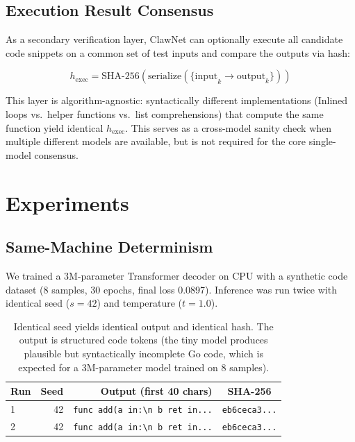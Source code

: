 \documentclass[11pt,a4paper]{article}
\begin{document}
\subsection{Execution Result Consensus}

As a secondary verification layer, ClawNet can optionally execute all
candidate code snippets on a common set of test inputs and compare the
outputs via hash:

\begin{equation}
h_{\text{exec}} = \text{SHA-256}(\text{serialize}(\text{\{input}_k \to \text{output}_k\}))
\end{equation}

This layer is algorithm-agnostic: syntactically different implementations
(Inlined loops vs.\ helper functions vs.\ list comprehensions) that compute
the same function yield identical $h_{\text{exec}}$. This serves as a
cross-model sanity check when multiple different models are available,
but is not required for the core single-model consensus.

\section{Experiments}
\label{sec:experiments}

\subsection{Same-Machine Determinism}

We trained a 3M-parameter Transformer decoder on CPU with a synthetic
code dataset (8 samples, 30 epochs, final loss 0.0897). Inference was
run twice with identical seed ($s=42$) and temperature ($t=1.0$).

\begin{table}[h]
\centering
\begin{tabular}{lrrc}
\toprule
Run & Seed & Output (first 40 chars) & SHA-256 \\
\midrule
1 & 42 & \texttt{func add(a in:\textbackslash n b ret in...} & \texttt{eb6ceca3...} \\
2 & 42 & \texttt{func add(a in:\textbackslash n b ret in...} & \texttt{eb6ceca3...} \\
\bottomrule
\end{tabular}
\caption{\label{tab:determinism} Identical seed yields identical output
and identical hash. The output is structured code tokens (the tiny model
produces plausible but syntactically incomplete Go code, which is expected
for a 3M-parameter model trained on 8 samples).}
\end{table}
\end{document}
